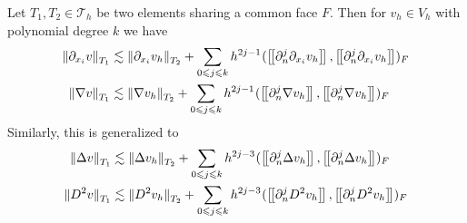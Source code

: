 \begin{lemma}[]
    \label{lemma:bi_local_facet_estimate_2}
    Let $T_{1},T_{2 } \in  \mathcal{T} _{h}$ be two elements sharing a common face $F$. Then for $v_{h} \in V_{h}$ with polynomial degree $k$ we have
    \begin{subequations}
    \begin{align}
        \label{eq:local_ghost:0}
        \| \partial _{x_{i}} v \|_{ T_{1} }^{  }  &\lesssim \| \partial_{ x_{i} } v_{h} \|_{ T_{2} }^{  } + \sum_{0\le j\le k}  {h^{2j -1}}^{} ( \jump{ \partial _{n}^{j} \partial _{x_{i}} v_{h} }, \jump{ \partial ^{j}_{n} \partial _{x_{i}} v_{h} }
        )_{F} \\
        \label{eq:local_ghost:1}
        \| \nabla  v \|_{ T_{1} }^{  }  & \lesssim \| \nabla  v_{h} \|_{ T_{2} }^{  } + \sum_{0\le j\le k}  {h^{2j -1}}^{} ( \jump{ \partial _{n}^{j} \nabla v_{h} }, \jump{ \partial ^{j}_{n} \nabla  v_{h} }    )_{F}
    \end{align}
    \end{subequations}
    Similarly, this is generalized to
    \begin{subequations}
        \begin{align}
        \label{eq:local_ghost:2}
        \| \Delta   v \|_{ T_{1} }^{  }  & \lesssim \| \Delta  v_{h} \|_{ T_{2} }^{  } + \sum_{0\le j\le k}  {h^{2j -3}}^{} ( \jump{ \partial _{n}^{j}\Delta  v_{h} }, \jump{ \partial ^{j}_{n} \Delta   v_{h} }    )_{F} \\
        \label{eq:local_ghost:3}
        \| D^2  v \|_{ T_{1} }^{  }  & \lesssim \| D^2 v_{h} \|_{ T_{2} }^{  } + \sum_{0\le j\le k}  {h^{2j -3}}^{} ( \jump{ \partial _{n}^{j} D^2 v_{h} }, \jump{ \partial ^{j}_{n} D^2  v_{h} }    )_{F}
        \end{align}
    \end{subequations}

\end{lemma}

